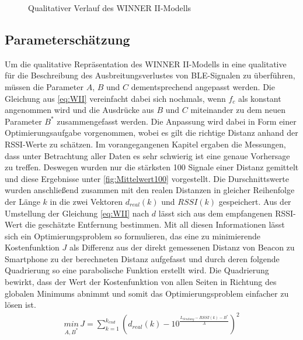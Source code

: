 \begin{figure}[H]
\centering
{}
\caption{Qualitativer Verlauf des WINNER II-Modells}
\label{fig:QualiWII}
\end{figure}
\subsection{Parameterschätzung}
Um die qualitative Repräsentation des WINNER II-Modells in eine qualitative für die Beschreibung des Ausbreitungsverlustes von BLE-Signalen zu überführen, müssen die Parameter $A$, $B$ und $C$ dementsprechend angepasst werden. Die Gleichung aus \ref{eq:WII} vereinfacht dabei sich nochmals, wenn $f_c$ als konstant angenommen wird und die Ausdrücke aus $B$ und $C$ miteinander zu dem neuen Parameter $B^{\ast}$ zusammengefasst werden. Die Anpassung wird dabei in Form einer Optimierungsaufgabe vorgenommen, wobei es gilt die richtige Distanz anhand der RSSI-Werte zu schätzen. Im vorangegangenen Kapitel ergaben die Messungen, dass unter Betrachtung aller Daten es sehr schwierig ist eine genaue Vorhersage zu treffen. Deswegen wurden nur die stärksten 100 Signale einer Distanz gemittelt und diese Ergebnisse unter \ref{fig:Mittelwert100} vorgestellt. Die Durschnittswerte wurden anschließend zusammen mit den realen Distanzen in gleicher Reihenfolge der Länge $k$ in die zwei Vektoren $d_{real}\left ( k \right )$ und $RSSI\left ( k \right )$ gespeichert. Aus der Umstellung der Gleichung \ref{eq:WII} nach $d$ lässt sich aus dem empfangenen RSSI-Wert die geschätzte Entfernung bestimmen. Mit all diesen Informationen lässt sich ein Optimierungsproblem so formulieren, das eine zu minimierende Kostenfunktion $J$ als Differenz aus der direkt gemessenen Distanz von Beacon zu Smartphone zu der berechneten Distanz aufgefasst und durch deren folgende Quadrierung so eine parabolische Funktion erstellt wird. Die Quadrierung bewirkt, dass der Wert der Kostenfunktion von allen Seiten in Richtung des globalen Minimums abnimmt und somit das Optimierungsproblem einfacher zu lösen ist. 
\begin{align}
\underset{A,B^{\ast}}{min}\, J=\sum_{k=1}^{k_{end}}\left ( d_{real}\left ( k \right ) -10^{\frac{L_{Sendung} - RSSI\left ( k \right ) - B^{\ast}}{A}} \right )^{2} \label{eq:WIIOpti}
\end{align}
